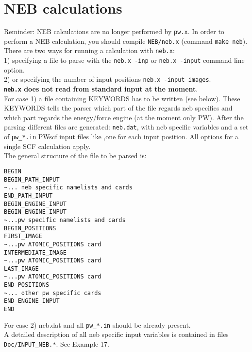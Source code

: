 \documentclass[12pt,a4paper]{article}
\def\pw.x{\texttt{pw.x}}
\def\neb.x{\texttt{neb.x}}
\begin{document}
\section{NEB calculations}

Reminder: NEB calculations are no longer performed by \pw.x.
In order to perform a NEB calculation, you should compile
\texttt{NEB/neb.x} (command \texttt{make neb}). \\

There are two ways for running a calculation with \neb.x: \\
1) specifying a file to parse with the \texttt{neb.x -inp} or 
\texttt{neb.x -input} command line option. \\
2) or specifying the number of input positions \texttt{neb.x -input\_images}. \\

{\bf \texttt{neb.x} does not read from standard input at the moment}. \\

For case 1) a file containing KEYWORDS has to be written (see below). 
These KEYWORDS tells the parser which part of the file regards neb specifics
and which part regards the energy/force engine (at the moment only PW).
After the parsing different files are generated: \texttt{neb.dat}, with
neb specific variables and a set of \texttt{pw\_*.in} PWscf input files like
,one for each input position. All options for a single SCF calculation apply. \\

The general structure of the file to be parsed is:

\begin{verbatim}
BEGIN
BEGIN_PATH_INPUT
~... neb specific namelists and cards
END_PATH_INPUT
BEGIN_ENGINE_INPUT
BEGIN_ENGINE_INPUT
~...pw specific namelists and cards
BEGIN_POSITIONS
FIRST_IMAGE
~...pw ATOMIC_POSITIONS card
INTERMEDIATE_IMAGE
~...pw ATOMIC_POSITIONS card
LAST_IMAGE
~...pw ATOMIC_POSITIONS card
END_POSITIONS
~... other pw specific cards
END_ENGINE_INPUT
END
\end{verbatim}

For case 2) neb.dat and all \texttt{pw\_*.in} should be already present. \\

A detailed description of all neb specific input
variables is contained in files \texttt{Doc/INPUT\_NEB.*}. See Example 17. \\
\end{document}
